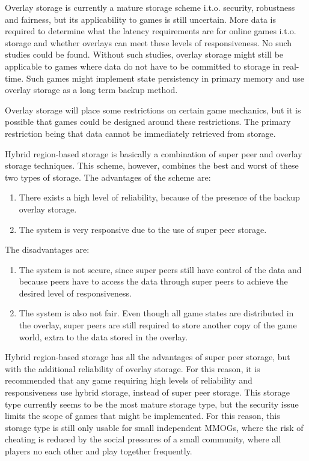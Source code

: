 \documentclass[10pt,a4paper,journal,cspaper,compsoc]{IEEEtran}
\begin{document}
Overlay storage is currently a mature storage scheme i.t.o. security, robustness and fairness, but its applicability to games is still uncertain.
More data is required to determine what the latency requirements are for online games i.t.o. storage and whether overlays can meet these levels of
responsiveness. No such studies could be found. Without such studies, overlay storage might still be applicable to games where data do not have to be
committed to storage in real-time. Such games might implement state persistency in primary memory and use overlay storage as a long term backup
method.

Overlay storage will place some restrictions on certain game mechanics, but it is possible that games could be designed around these restrictions.
The primary restriction being that data cannot be immediately retrieved from storage.



Hybrid region-based storage is basically a combination of super peer and overlay storage techniques. This scheme, however, combines the best and
worst of these two types of storage. The advantages of the scheme are:
%
\begin{enumerate}
    \item There exists a high level of reliability, because of the presence of the backup overlay storage.
    \item The system is very responsive due to the use of super peer storage.
\end{enumerate}

The disadvantages are:
%
\begin{enumerate}
    \item The system is not secure, since super peers still have control of the data and because peers have to access the data through super
        peers to achieve the desired level of responsiveness.
    \item The system is also not fair. Even though all game states are distributed in the overlay, super peers are still required to store
        another copy of the game world, extra to the data stored in the overlay.
\end{enumerate}

Hybrid region-based storage has all the advantages of super peer storage, but with the additional reliability of overlay storage. For this reason, it
is recommended that any game requiring high levels of reliability and responsiveness use hybrid storage, instead of super peer storage. This storage
type currently seems to be the most mature storage type, but the security issue limits the scope of games that might be implemented. For this reason,
this storage type is still only usable for small independent MMOGs, where the risk of cheating is reduced by the social pressures of a small
community, where all players no each other and play together frequently.
\end{document}
